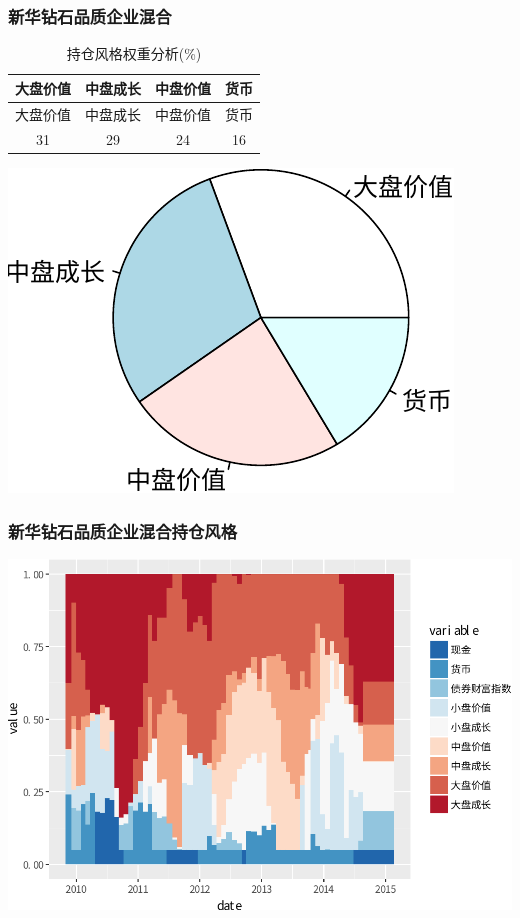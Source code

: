 \documentclass[hyperref,]{ctexart}
\begin{document}
\subsubsection{新华钻石品质企业混合}

\begin{longtable}[]{@{}cccc@{}}
\caption{持仓风格权重分析(\%)}\tabularnewline
\toprule
大盘价值 & 中盘成长 & 中盘价值 & 货币\tabularnewline
\midrule
\endfirsthead
\toprule
大盘价值 & 中盘成长 & 中盘价值 & 货币\tabularnewline
\midrule
\endhead
31 & 29 & 24 & 16\tabularnewline
\bottomrule
\end{longtable}

\includegraphics{caominchang-details_files/figure-latex/unnamed-chunk-9-1.pdf}

\subsubsection{新华钻石品质企业混合持仓风格}

\includegraphics{caominchang-details_files/figure-latex/unnamed-chunk-32-1.pdf}
\end{document}
